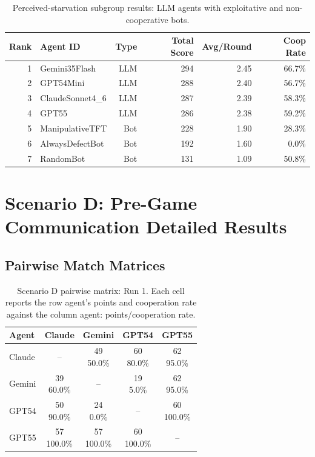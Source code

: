 \documentclass[11pt]{article}
\begin{document}
\begin{table}[H]
\centering
\caption{Perceived-starvation subgroup results: LLM agents with exploitative and non-cooperative bots.}
\label{tab:starvation_subgroup_llm_exploitative}
\begin{tabular}{rlrrrr}
\toprule
Rank & Agent ID & Type & Total Score & Avg/Round & Coop Rate \\
\midrule
1 & Gemini35Flash & LLM & 294 & 2.45 & 66.7\% \\
2 & GPT54Mini & LLM & 288 & 2.40 & 56.7\% \\
3 & ClaudeSonnet4\_6 & LLM & 287 & 2.39 & 58.3\% \\
4 & GPT55 & LLM & 286 & 2.38 & 59.2\% \\
5 & ManipulativeTFT & Bot & 228 & 1.90 & 28.3\% \\
6 & AlwaysDefectBot & Bot & 192 & 1.60 & 0.0\% \\
7 & RandomBot & Bot & 131 & 1.09 & 50.8\% \\
\bottomrule
\end{tabular}
\end{table}


\clearpage
\section{Scenario D: Pre-Game Communication Detailed Results}
\label{app:communication_details}

\subsection{Pairwise Match Matrices}

\begin{table}[H]
\centering
\caption{Scenario D pairwise matrix: Run 1. Each cell reports the row agent's points and cooperation rate against the column agent: points/cooperation rate.}
\label{tab:comm_matrix_run1}
\small
\begin{tabular}{lcccc}
\toprule
Agent & Claude & Gemini & GPT54 & GPT55 \\
\midrule
Claude & -- & \shortstack{49\\50.0\%} & \shortstack{60\\80.0\%} & \shortstack{62\\95.0\%} \\
Gemini & \shortstack{39\\60.0\%} & -- & \shortstack{19\\5.0\%} & \shortstack{62\\95.0\%} \\
GPT54 & \shortstack{50\\90.0\%} & \shortstack{24\\0.0\%} & -- & \shortstack{60\\100.0\%} \\
GPT55 & \shortstack{57\\100.0\%} & \shortstack{57\\100.0\%} & \shortstack{60\\100.0\%} & -- \\
\bottomrule
\end{tabular}
\end{table}
\end{document}
